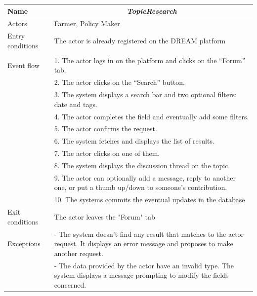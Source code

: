 \begin{table}[H]
	\centering
	\begin{tabularx}{\linewidth}{|l|X|}
		\hline
		Name & \multicolumn{1}{c|}{\textit{\textbf{TopicResearch}}}                                                   \tabularnewline \hline
		Actors                                               & Farmer, Policy Maker                                                   \tabularnewline \hline
		Entry conditions                                              & The actor is already registered on the DREAM platform
		\tabularnewline
		&
		\tabularnewline \hline
		Event flow                                         & 1.	The actor logs in on the platform and clicks on the “Forum” tab.                                           \tabularnewline 
		& 2.	The actor clicks on the “Search” button.                                           \tabularnewline 
		& 3.	The system displays a search bar and two optional filters: date and tags.                                           \tabularnewline 
		& 4.	The actor completes the field and eventually add some filters.                                    \tabularnewline
		& 5.	The actor confirms the request.                                           \tabularnewline
		& 6.	The system fetches and displays the list of results.                                     \tabularnewline
		& 7.	The actor clicks on one of them.                                \tabularnewline
		& 8.	The system displays the discussion thread on the topic.                              \tabularnewline
		& 9.	The actor can optionally add a message, reply to another one, or put a thumb up/down to someone’s contribution. 
		\tabularnewline
		& 10.	The systems commits the eventual updates in the database                             \tabularnewline \hline
		Exit conditions 
		& The actor leaves the "Forum" tab
		\tabularnewline \hline
		Exceptions 
		& -	The system doesn’t find any result that matches to the actor request. It displays an error message and proposes to make another request.
		\tabularnewline
		& -	The data provided by the actor have an invalid type. The system displays a message prompting  to modify the fields concerned.
		\tabularnewline
		\hline
	\end{tabularx}   
\end{table}


